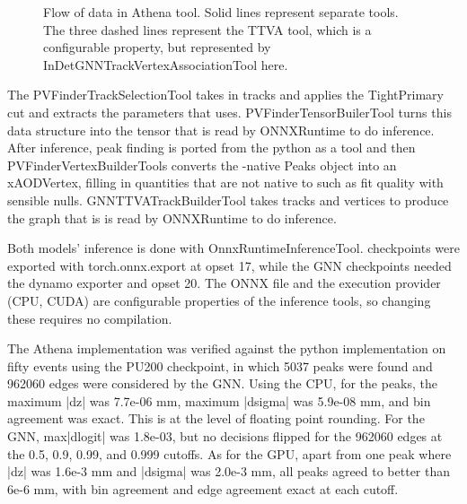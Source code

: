 \begin{figure}
{
    }
    \caption{Flow of data in \pvf{} Athena tool. Solid lines represent separate tools. The three dashed lines represent the TTVA tool, which is a configurable property, but represented by InDetGNNTrackVertexAssociationTool here. }
    \label{fig:athena-diagram}
\end{figure}

The PVFinderTrackSelectionTool takes in tracks and applies the TightPrimary cut and extracts the parameters that \pvf{} uses. PVFinderTensorBuilerTool turns this data structure into the tensor that is read by ONNXRuntime to do inference. After inference, peak finding is ported from the python as a tool and then PVFinderVertexBuilderTools converts the \pvf{}-native Peaks object into an xAODVertex, filling in quantities that are not native to \pvf{} such as fit quality with sensible nulls. GNNTTVATrackBuilderTool takes tracks and vertices to produce the graph that is is read by ONNXRuntime to do inference.

Both models' inference is done with OnnxRuntimeInferenceTool. \pvf{} checkpoints were exported with torch.onnx.export at opset 17, while the GNN checkpoints needed the dynamo exporter and opset 20. The ONNX file and the execution provider (CPU, CUDA) are configurable properties of the inference tools, so changing these requires no compilation.

The Athena implementation was verified against the python implementation on fifty events using the PU200 checkpoint, in which 5037 peaks were found and 962060 edges were considered by the GNN. Using the CPU, for the peaks, the maximum |dz| was 7.7e-06 mm, maximum |dsigma| was 5.9e-08 mm, and bin agreement was exact. This is at the level of floating point rounding. For the GNN, max|dlogit| was 1.8e-03, but no decisions flipped for the 962060 edges at the 0.5, 0.9, 0.99, and 0.999 cutoffs. As for the GPU, apart from one peak where |dz| was 1.6e-3 mm and |dsigma| was 2.0e-3 mm, all peaks agreed to better than 6e-6 mm, with bin agreement and edge agreement exact at each cutoff.




